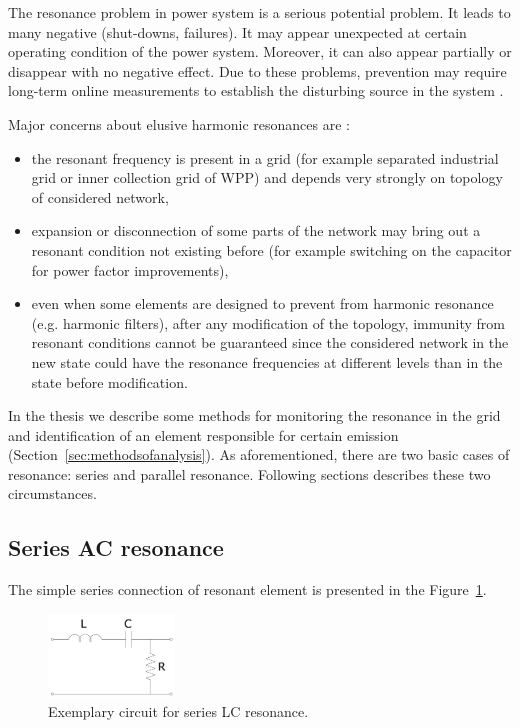 \documentclass[12pt]{report} %
\begin{document}
The resonance problem in power system is a serious potential problem. It leads to many negative (shut-downs, failures). It may appear unexpected at certain operating condition of the power system. Moreover, it can also appear partially or disappear with no negative effect. Due to these problems, prevention may require long-term online measurements to establish the disturbing source in the system \cite{das}.

Major concerns about elusive harmonic resonances are \cite{das}:
\begin{itemize}
	\item the resonant frequency is present in a grid (for example separated industrial grid or inner collection grid of WPP) and depends very strongly on topology of considered network,
	\item expansion or disconnection of some parts of the network may bring out a resonant condition not existing before (for example switching on the capacitor for power factor improvements),
	\item even when some elements are designed to prevent from harmonic resonance (e.g. harmonic filters), after any modification of the topology, immunity from resonant conditions cannot be guaranteed since the considered network in the new state could have the resonance frequencies at different levels than in the state before modification.
\end{itemize}

In the thesis we describe some methods for monitoring the resonance in the grid and identification of an element responsible for certain emission (Section~\ref{sec:methodsofanalysis}). As aforementioned, there are two basic cases of resonance: series and parallel resonance. Following sections describes these two circumstances.

\subsection{Series AC resonance}
The simple series connection of resonant element is presented in the Figure~\ref{fig:seriescircuit}.

\begin{figure}[htb]
	\centering
    	\includegraphics[width=0.3\textwidth]{img/theory/series_circ.PNG}
  	\caption{Exemplary circuit for series LC resonance.}
  	\label{fig:seriescircuit}
\end{figure}
\FloatBarrier
\end{document}
